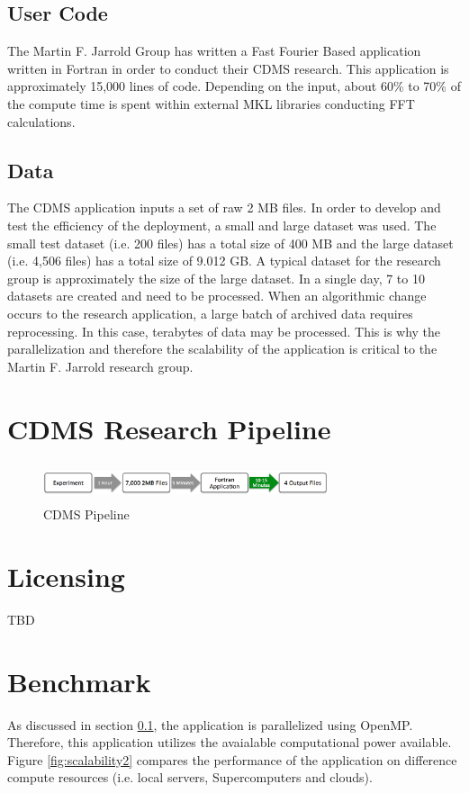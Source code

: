 \documentclass[9pt,twocolumn,twoside]{styles/osajnl}
\begin{document}
\subsection{User Code} \label{code}
The Martin F. Jarrold Group has written a Fast Fourier Based
application written in Fortran in order to conduct their CDMS
research. This application is approximately 15,000 lines of
code. Depending on the input, about 60\% to 70\% of the compute time
is spent within external MKL libraries conducting FFT calculations.

\subsection{Data} \label{data}
The CDMS application inputs a set of raw 2 MB files. In order to
develop and test the efficiency of the deployment, a small and large
dataset was used. The small test dataset (i.e. 200 files) has a total
size of 400 MB and the large dataset (i.e. 4,506 files) has a total
size of 9.012 GB. A typical dataset for the research group is
approximately the size of the large dataset. In a single day, 7 to 10
datasets are created and need to be processed. When an algorithmic
change occurs to the research application, a large batch of archived
data requires reprocessing. In this case, terabytes of data may be
processed. This is why the parallelization and therefore the
scalability of the application is critical to the Martin F. Jarrold
research group.

\section{CDMS Research Pipeline} \label{cdms}
\begin{figure}
\centering
\includegraphics[height=0.45in, width=3.3in]{images/pipeline}
\caption{CDMS Pipeline}
\end{figure}

\section{Licensing} \label{licensing}
TBD

\section{Benchmark}
As discussed in section \ref{code}, the application is parallelized
using OpenMP. Therefore, this application utilizes the avaialable
computational power available. Figure \ref{fig:scalability2} compares the performance of the application on difference compute resources (i.e. local servers, Supercomputers and clouds). 
\end{document}
